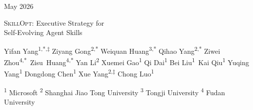 \documentclass[
]{article}
\author{}
\date{}
\newcommand{\ourmethod}{\textsc{SkillOpt}\xspace}
\begin{document}
\thispagestyle{empty}
\noindent
\begin{minipage}[c]{0.5\linewidth}
\raggedright
\raisebox{-0.5\height}{\msftbrandmark}
\end{minipage}%
\begin{minipage}[c]{0.49\linewidth}
\raggedleft
{\msftdatefont\small\color{msftgray}May 2026}
\end{minipage}\par
\vspace{0.35em}
\noindent{\color{msftline}\rule{\linewidth}{0.8pt}\par}

\vspace{1.0em}
\begin{center}
{{\msfttitlefont\fontsize{21}{25}\selectfont\color{msftdark}
\ourmethod{}: Executive Strategy for\\
Self-Evolving Agent Skills\par}}
\vspace{1.25em}

{\normalsize\rmfamily\color{msftdark}
Yifan Yang\textsuperscript{1,*,$\ddagger$} \hspace{0.6em}
Ziyang Gong\textsuperscript{2,*} \hspace{0.6em}
Weiquan Huang\textsuperscript{3,*} \hspace{0.6em}
Qihao Yang\textsuperscript{2,*} \hspace{0.6em}
Ziwei Zhou\textsuperscript{4,*}\
Zisu~Huang\textsuperscript{4,*} \hspace{0.6em}
Yan Li\textsuperscript{2} \hspace{0.6em}
Xuemei Gao\textsuperscript{1} \hspace{0.6em}
Qi Dai\textsuperscript{1} \hspace{0.6em}
Bei Liu\textsuperscript{1}\
Kai Qiu\textsuperscript{1} \hspace{0.6em}
Yuqing Yang\textsuperscript{1} \hspace{0.6em}
Dongdong Chen\textsuperscript{1} \hspace{0.6em}
Xue Yang\textsuperscript{2,$\ddagger$} \hspace{0.6em}
Chong Luo\textsuperscript{1}\par
}
\vspace{0.22cm}

{\footnotesize\rmfamily\color{msftgray}
\textsuperscript{1} Microsoft \quad
\textsuperscript{2} Shanghai Jiao Tong University \quad
\textsuperscript{3} Tongji University \quad
\textsuperscript{4} Fudan University\par
}
\end{center}
\end{document}
